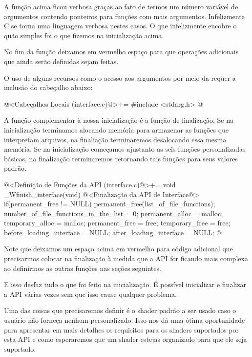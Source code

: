 A função acima ficou verbosa graças ao fato de termos um número
variável de argumentos contendo ponteiros para funções com mais
argumentos. Infelizmente C se torna uma linguagem verbosa nestes
casos. O que infelizmente encobre o quão simples foi o que fizemos na
inicialização acima.

No fim da função deixamos em vermelho espaço para que operações
adicionais que ainda serão definidas sejam feitas.

O uso de alguns recursos como o acesso aos argumentos por meio da
 requer a inclusão do cabeçalho abaixo:

\iniciocodigo
@<Cabeçalhos Locais (interface.c)@>+=
#include <stdarg.h>
@
\fimcodigo


A função complementar à nossa inicialização é a função de
finalização. Se na inicialização terminamos alocando memória para
armazenar as funções que interpretam arquivos, na finaliação
terminaremos desalocando essa mesma memória. Se na inicialização
começamos ajustanto as seis funções personalizadas básicas, na
finalização terminaremos retornando tais funções para seus valores
padrão.

\iniciocodigo
@<Definição de Funções da API (interface.c)@>+=
void _Wfinish_interface(void){
  @<Finalização da API de Interface@>
  if(permanent_free != NULL)
    permanent_free(list_of_file_functions);
  number_of_file_functions_in_the_list = 0;
  permanent_alloc = malloc;
  temporary_alloc = malloc;
  permanent_free = free;
  temporary_free = free;
  before_loading_interface = NULL;
  after_loading_interface = NULL;
}
@
\fimcodigo

Note que deixamos um espaço acima em vermelho para código adicional
que precisarmos colocar na finalização à medida que a API for ficando
mais complexa ao definirmos as outras funções nas seções seguintes.

E isso desfaz tudo o que foi feito na inicialização. É possível
inicializar e finalizar a API várias vezes sem que isso cause qualquer
problema.


Uma das coisas que precisaremos definir é o shader padrão a ser usado
caso o usuário não forneça nenhum personalizado. Isso nos dá uma ótima
oportunidade para apresentar em mais detalhes os requisitos para os
shaders suportados por esta API e como esperaremos que um shader
estejas organizado para que ele seja suportado.

